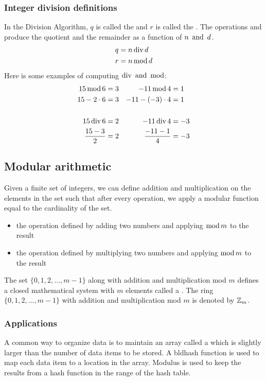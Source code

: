 \subsubsection*{Integer division definitions}
In the Division Algorithm, $q$ is called the  and $r$ is called the . The operations \bld{$\tdiv$} and \bld{$\tmod$} produce the quotient and the remainder as a function of $n \operatorname{~\text{and}~} d$.
\begin{align*}
  q & = n \operatorname{\text{div}} d \\
  r & = n \operatorname{\text{mod}} d
\end{align*}
Here is some examples of computing $\operatorname{\text{div}} \operatorname{~\text{and}~} \operatorname{\text{mod}}$:
\begin{align*}
  15 \operatorname{\text{mod}} 6       & = 3 & -11 \operatorname{\text{mod}} 4        & = 1  \\
  15 - 2 \cdot 6   & = 3 & -11 - (-3) \cdot 4 & = 1  \\ \\
  15 \operatorname{\text{div}} 6       & = 2 & -11 \operatorname{\text{div}} 4        & = -3 \\
  \frac{15 - 3}{2} & = 2 & \frac{-11 - 1}{4}  & = -3
\end{align*}

\subsection{Modular arithmetic}
Given a finite set of integers, we can define addition and multiplication on the elements in the set such that after every operation, we apply a modular function equal to the cardinality of the set.
\begin{itemize}
  \item {}
        \subitem the operation defined by adding two numbers and applying $\operatorname{\text{mod}} m$ to the result
  \item {}
        \subitem the operation defined by multiplying two numbers and applying $\operatorname{\text{mod}} m$ to the result
\end{itemize}
The set $\{0,1,2,\ldots,m-1\}$ along with addition and multiplication mod $m$ defines a closed mathematical system with $m$ elements called a . The ring $\{0,1,2,\ldots,m-1\}$ with addition and multiplication mod $m$ is denoted by $\mathbb{Z}_m$.

\subsubsection*{Applications}
A common way to organize data is to maintain an array called a  which is slightly larger than the number of data items to be stored. A bld{hash function} is used to map each data item to a location in the array. Modulus is used to keep the results from a hash function in the range of the hash table.

